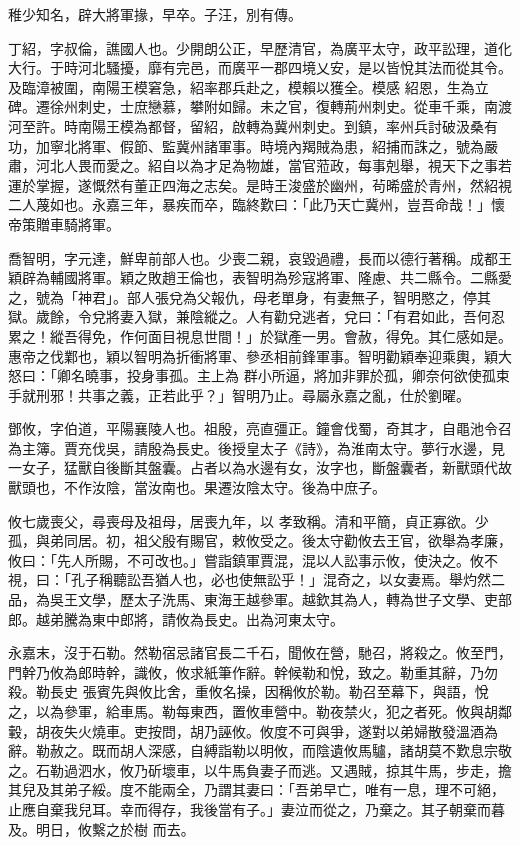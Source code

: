 \begin{pinyinscope}
 稚少知名，辟大將軍掾，早卒。子汪，別有傳。



 丁紹，字叔倫，譙國人也。少開朗公正，早歷清官，為廣平太守，政平訟理，道化大行。于時河北騷擾，靡有完邑，而廣平一郡四境乂安，是以皆悅其法而從其令。及臨漳被圍，南陽王模窘急，紹率郡兵赴之，模賴以獲全。模感
 紹恩，生為立碑。遷徐州刺史，士庶戀慕，攀附如歸。未之官，復轉荊州刺史。從車千乘，南渡河至許。時南陽王模為都督，留紹，啟轉為冀州刺史。到鎮，率州兵討破汲桑有功，加寧北將軍、假節、監冀州諸軍事。時境內羯賊為患，紹捕而誅之，號為嚴肅，河北人畏而愛之。紹自以為才足為物雄，當官蒞政，每事剋舉，視天下之事若運於掌握，遂慨然有董正四海之志矣。是時王浚盛於幽州，茍晞盛於青州，然紹視二人蔑如也。永嘉三年，暴疾而卒，臨終歎曰：「此乃天亡冀州，豈吾命哉！」懷帝策贈車騎將軍。



 喬智明，字元達，鮮卑前部人也。少喪二親，哀毀過禮，長而以德行著稱。成都王穎辟為輔國將軍。穎之敗趙王倫也，表智明為殄寇將軍、隆慮、共二縣令。二縣愛之，號為「神君」。部人張兌為父報仇，母老單身，有妻無子，智明愍之，停其獄。歲餘，令兌將妻入獄，兼陰縱之。人有勸兌逃者，兌曰：「有君如此，吾何忍累之！縱吾得免，作何面目視息世間！」於獄產一男。會赦，得免。其仁感如是。惠帝之伐鄴也，穎以智明為折衝將軍、參丞相前鋒軍事。智明勸穎奉迎乘輿，穎大怒曰：「卿名曉事，投身事孤。主上為
 群小所逼，將加非罪於孤，卿奈何欲使孤束手就刑邪！共事之義，正若此乎？」智明乃止。尋屬永嘉之亂，仕於劉曜。



 鄧攸，字伯道，平陽襄陵人也。祖殷，亮直彊正。鐘會伐蜀，奇其才，自黽池令召為主簿。賈充伐吳，請殷為長史。後授皇太子《詩》，為淮南太守。夢行水邊，見一女子，猛獸自後斷其盤囊。占者以為水邊有女，汝字也，斷盤囊者，新獸頭代故獸頭也，不作汝陰，當汝南也。果遷汝陰太守。後為中庶子。



 攸七歲喪父，尋喪母及祖母，居喪九年，以
 孝致稱。清和平簡，貞正寡欲。少孤，與弟同居。初，祖父殷有賜官，敕攸受之。後太守勸攸去王官，欲舉為孝廉，攸曰：「先人所賜，不可改也。」嘗詣鎮軍賈混，混以人訟事示攸，使決之。攸不視，曰：「孔子稱聽訟吾猶人也，必也使無訟乎！」混奇之，以女妻焉。舉灼然二品，為吳王文學，歷太子洗馬、東海王越參軍。越欽其為人，轉為世子文學、吏部郎。越弟騰為東中郎將，請攸為長史。出為河東太守。



 永嘉末，沒于石勒。然勒宿忌諸官長二千石，聞攸在營，馳召，將殺之。攸至門，門幹乃攸為郎時幹，識攸，攸求紙筆作辭。幹候勒和悅，致之。勒重其辭，乃勿殺。勒長史
 張賓先與攸比舍，重攸名操，因稱攸於勒。勒召至幕下，與語，悅之，以為參軍，給車馬。勒每東西，置攸車營中。勒夜禁火，犯之者死。攸與胡鄰轂，胡夜失火燒車。吏按問，胡乃誣攸。攸度不可與爭，遂對以弟婦散發溫酒為辭。勒赦之。既而胡人深感，自縛詣勒以明攸，而陰遺攸馬驢，諸胡莫不歎息宗敬之。石勒過泗水，攸乃斫壞車，以牛馬負妻子而逃。又遇賊，掠其牛馬，步走，擔其兒及其弟子綏。度不能兩全，乃謂其妻曰：「吾弟早亡，唯有一息，理不可絕，止應自棄我兒耳。幸而得存，我後當有子。」妻泣而從之，乃棄之。其子朝棄而暮及。明日，攸繫之於樹
 而去。




\end{pinyinscope}
